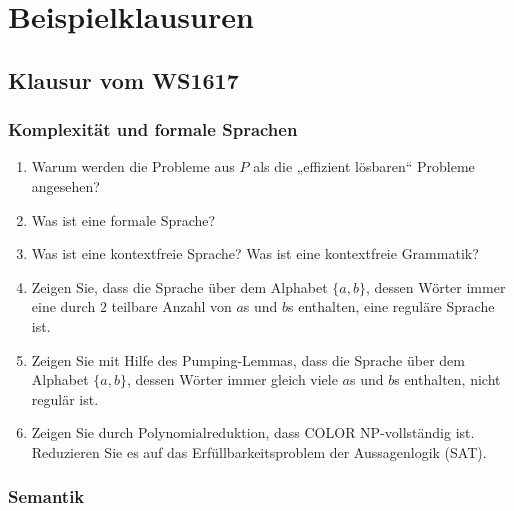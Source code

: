 \documentclass[
  a4paper,
  11pt,
]{scrartcl}
\newcommand{\COLOR}{\textsf{COLOR}}
\newcommand{\SAT}{\textsf{SAT}}
\begin{document}
\section{Beispielklausuren}
\label{sec:beispielklausuren}

\subsection{Klausur vom WS1617}
\label{sub:klausur_vom_ws1617}

\subsubsection{Komplexität und formale Sprachen}
\label{ssub:komplexitaet_und_formale_Sprachen}

\begin{enumerate}
  \item Warum werden die Probleme aus $P$ als die „effizient lösbaren“ Probleme
    angesehen?

  \item Was ist eine formale Sprache?

  \item Was ist eine kontextfreie Sprache? Was ist eine kontextfreie Grammatik?

  \item Zeigen Sie, dass die Sprache über dem Alphabet $\{a, b\}$, dessen Wörter
    immer eine durch $2$ teilbare Anzahl von $a$s und $b$s enthalten, eine
    reguläre Sprache ist.

  \item Zeigen Sie mit Hilfe des Pumping-Lemmas, dass die Sprache über dem
    Alphabet $\{a, b\}$, dessen Wörter immer gleich viele $a$s und $b$s
    enthalten, nicht regulär ist.

  \item Zeigen Sie durch Polynomialreduktion, dass \COLOR{} NP-vollständig ist.
    Reduzieren Sie es auf das Erfüllbarkeitsproblem der Aussagenlogik (\SAT).
\end{enumerate}

\subsubsection{Semantik}
\label{ssub:Semantik}
\end{document}
